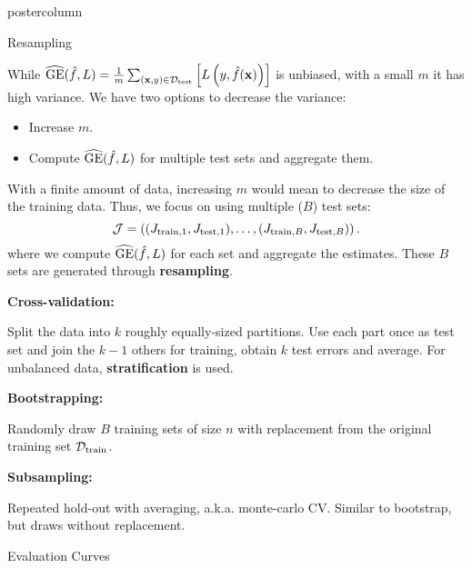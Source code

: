 \documentclass{beamer}
\begin{document}
\begin{frame}[fragile]{}
\begin{columns}
\begin{column}{.31\textwidth}
\begin{beamercolorbox}[center]{postercolumn}
\begin{minipage}{.98\textwidth}
{\begin{myblock}{ }
     \end{myblock}

    \begin{myblock}{Resampling}

      While $\widehat{\mathrm{GE}}(\hat{f}, L) = \frac{1}{m}\sum_{(\mathbf{x}, y) \in \mathcal{D}_{\text{test}}} \left[ L\left(y, \hat{f}(\mathbf{x})\right) \right]$ is unbiased, with a small $m$ it has high variance.
      We have two options to decrease the variance:
      \begin{itemize}[$\bullet$]
      \setlength{\itemindent}{+.3in}
      \item Increase $m$.
      \item Compute $\widehat{\mathrm{GE}}(\hat{f}, L)$ for multiple test sets and aggregate them.
      \end{itemize}

        With a finite amount of data, increasing $m$ would mean to decrease the size of the training data.
        Thus, we focus on using multiple ($B$) test sets: 
        $$\mathcal{J} = \left((J_{\mathrm{train},1}, J_{\mathrm{test},1}),\dots,(J_{\mathrm{train},B}, J_{\mathrm{test},B})\right).$$
        where we compute $\widehat{\mathrm{GE}}(\hat{f}, L)$ for each set and aggregate the estimates.
        These $B$ sets are generated through \textbf{resampling}.
            
            \begin{codebox}
            \textbf{Cross-validation: }
            \end{codebox}
            Split the data into $k$ roughly equally-sized partitions.
            Use each part once as test set and join the $k-1$ others for training,
            obtain $k$ test errors and average.
            For unbalanced data, \textbf{stratification} is used.
        
            \begin{codebox}
            \textbf{Bootstrapping: }
            \end{codebox}
            Randomly draw $B$ training sets of size $n$ with replacement from the original training set $\mathcal{D}_{\text{train}}$.
        
            \begin{codebox}
            \textbf{Subsampling: }
            \end{codebox}
              Repeated hold-out with averaging, a.k.a. monte-carlo CV. Similar to bootstrap, but draws without replacement.
            
            \end{myblock}

            \begin{myblock}{Evaluation Curves}
            \end{myblock}

}
\end{minipage}
\end{beamercolorbox}
\end{column}
\end{columns}
\end{frame}
\end{document}
